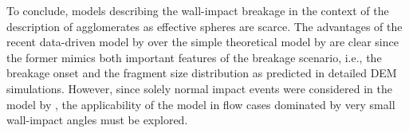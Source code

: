 To conclude, models describing the wall-impact breakage in the context
of the description of agglomerates as effective spheres are scarce.
The advantages of the recent data-driven model by
\citet{van2020analysis} over the simple theoretical model by
\citet{kousaka1979dispersion} are clear since the former mimics both
important features of the breakage scenario, i.e., the breakage onset
and the fragment size distribution as predicted in detailed DEM
simulations. However, since solely normal impact events were
considered in the model by \citet{van2020analysis}, the applicability
of the model in flow cases dominated by very small wall-impact angles
must be explored.
%
